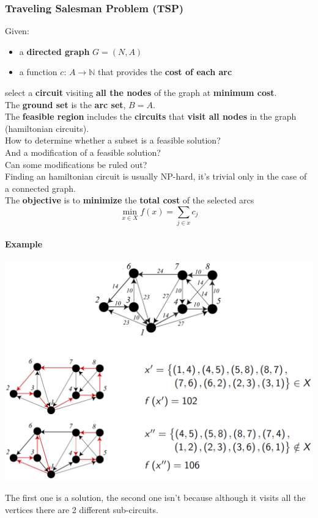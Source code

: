 \documentclass[11pt]{article}
\begin{document}
	\newpage
	
	\subsubsection{Traveling Salesman Problem (TSP)}
	Given:
	\begin{itemize}
		\item a \textbf{directed graph} $G = (N, A)$
		\item a function $c : \, A \rightarrow \mathbb{N}$ that provides the \textbf{cost of each arc}
	\end{itemize}
	select a \textbf{circuit} visiting \textbf{all the nodes} of the graph at \textbf{minimum cost}.\\
	
	The \textbf{ground set} is the \textbf{arc set}, $B = A$.\\
	
	The \textbf{feasible region} includes the \textbf{circuits} that \textbf{visit all nodes} in the graph (hamiltonian circuits).\\
	
	How to determine whether a subset is a feasible solution? \\
	And a modification of a feasible solution? \\
	Can some modifications be ruled out? \\
	Finding an hamiltonian circuit is usually NP-hard, it's trivial only in the case of a connected graph. \\
	
	The \textbf{objective} is to \textbf{minimize} the \textbf{total cost} of the selected arcs
	$$ \min_{x \in X} f(x) = \sum_{j \in x} c_j $$
	
	\newpage
	
	\paragraph{Example}
	\begin{center}
		\includegraphics[width=\columnwidth]{img/TSP1}
	\end{center}
	The first one is a solution, the second one isn't because although it visits all the vertices there are 2 different sub-circuits.\\
	
\end{document}
